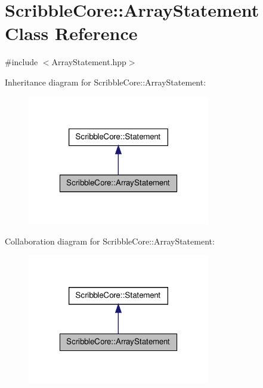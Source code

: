 \hypertarget{class_scribble_core_1_1_array_statement}{\section{Scribble\-Core\-:\-:Array\-Statement Class Reference}
\label{class_scribble_core_1_1_array_statement}
}


{\ttfamily \#include $<$Array\-Statement.\-hpp$>$}



Inheritance diagram for Scribble\-Core\-:\-:Array\-Statement\-:
\nopagebreak
\begin{figure}[H]
\begin{center}
\leavevmode
\includegraphics[width=226pt]{class_scribble_core_1_1_array_statement__inherit__graph}
\end{center}
\end{figure}


Collaboration diagram for Scribble\-Core\-:\-:Array\-Statement\-:
\nopagebreak
\begin{figure}[H]
\begin{center}
\leavevmode
\includegraphics[width=226pt]{class_scribble_core_1_1_array_statement__coll__graph}
\end{center}
\end{figure}
